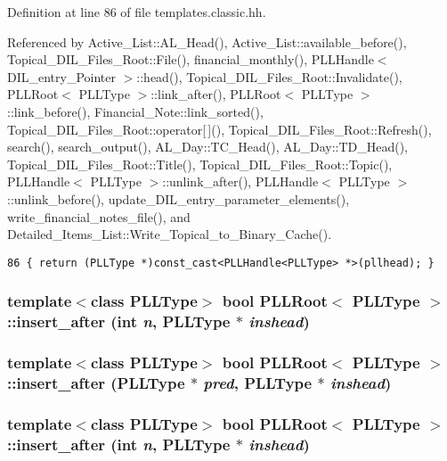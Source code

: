 Definition at line 86 of file templates.classic.hh.

Referenced by Active\_\-List::AL\_\-Head(), Active\_\-List::available\_\-before(), Topical\_\-DIL\_\-Files\_\-Root::File(), financial\_\-monthly(), PLLHandle$<$ DIL\_\-entry\_\-Pointer $>$::head(), Topical\_\-DIL\_\-Files\_\-Root::Invalidate(), PLLRoot$<$ PLLType $>$::link\_\-after(), PLLRoot$<$ PLLType $>$::link\_\-before(), Financial\_\-Note::link\_\-sorted(), Topical\_\-DIL\_\-Files\_\-Root::operator[$\,$](), Topical\_\-DIL\_\-Files\_\-Root::Refresh(), search(), search\_\-output(), AL\_\-Day::TC\_\-Head(), AL\_\-Day::TD\_\-Head(), Topical\_\-DIL\_\-Files\_\-Root::Title(), Topical\_\-DIL\_\-Files\_\-Root::Topic(), PLLHandle$<$ PLLType $>$::unlink\_\-after(), PLLHandle$<$ PLLType $>$::unlink\_\-before(), update\_\-DIL\_\-entry\_\-parameter\_\-elements(), write\_\-financial\_\-notes\_\-file(), and Detailed\_\-Items\_\-List::Write\_\-Topical\_\-to\_\-Binary\_\-Cache().



\footnotesize\begin{verbatim}86 { return (PLLType *)const_cast<PLLHandle<PLLType> *>(pllhead); } 
\end{verbatim}\normalsize 
{}
\subsubsection{\setlength{\rightskip}{0pt plus 5cm}template$<$class PLLType$>$ bool PLLRoot$<$ {\bf PLLType} $>$::insert\_\-after (int {\em n}, {\bf PLLType} $\ast$ {\em inshead})\hspace{0.3cm}{\tt  [inline]}}\label{classPLLRoot_a64}


\subsubsection{\setlength{\rightskip}{0pt plus 5cm}template$<$class PLLType$>$ bool PLLRoot$<$ {\bf PLLType} $>$::insert\_\-after ({\bf PLLType} $\ast$ {\em pred}, {\bf PLLType} $\ast$ {\em inshead})\hspace{0.3cm}{\tt  [inline]}}\label{classPLLRoot_a63}


\subsubsection{\setlength{\rightskip}{0pt plus 5cm}template$<$class PLLType$>$ bool PLLRoot$<$ {\bf PLLType} $>$::insert\_\-after (int {\em n}, {\bf PLLType} $\ast$ {\em inshead})\hspace{0.3cm}{\tt  [inline]}}\label{classPLLRoot_a47}


